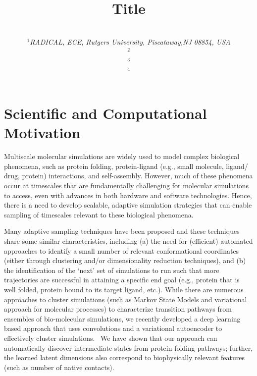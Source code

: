 \documentclass[conference,final]{IEEEtran}
\begin{document}
\title{Title}

\author{\\
   {\footnotesize{\emph{$^{1}$RADICAL, ECE, Rutgers University, Piscataway,NJ 08854, USA}}}\\
   \footnotesize{\emph{$^{2}$}}\\
   \footnotesize{\emph{$^{3}$}}\\
   \footnotesize{\emph{$^{4}$}\upp\upp\upp}
   }


\date{}
\maketitle

\section{Scientific  and Computational Motivation}

Multiscale molecular simulations are widely used to model complex biological
phenomena, such as protein folding, protein-ligand (e.g., small molecule,
ligand/ drug, protein) interactions, and self-assembly. However, much of
these phenomena occur at timescales that are fundamentally challenging for
molecular simulations to access, even with advances in both hardware and
software technologies. Hence, there is a need to develop scalable, adaptive
simulation strategies that can enable sampling of timescales relevant to
these biological phenomena.

Many adaptive sampling techniques have been proposed and these techniques
share some similar characteristics, including (a) the need for (efficient)
automated approaches to identify a small number of relevant conformational
coordinates (either through clustering and/or dimensionality reduction
techniques), and (b) the identification of the ‘next’ set of simulations to
run such that more trajectories are successful in attaining a specific end
goal (e.g., protein that is well folded, protein bound to its target ligand,
etc.). While there are numerous approaches to cluster simulations (such as
Markov State Models and variational approach for molecular processes) to
characterize transition pathways from ensembles of bio-molecular simulations,
we recently developed a deep learning based approach that uses convolutions
and a variational autoencoder to effectively cluster simulations.~\cite{bhowmik2018deep} 
We have shown that our approach can automatically discover intermediate states 
from protein folding pathways; further, the learned latent dimensions also
correspond to biophysically relevant features (such as number of native
contacts).
\end{document}
